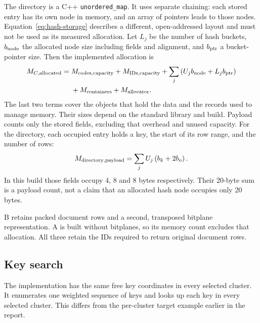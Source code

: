 The directory is a C++ \texttt{unordered\_map}. It uses separate chaining: each stored entry has its own node in memory, and an array of
pointers leads to those nodes. Equation~\eqref{eq:hash-storage}
describes a different, open-addressed layout and must not be used as its measured allocation.
Let $L_j$ be the number of hash buckets, $b_{\rm node}$ the allocated node size including fields
and alignment, and $b_{\rm ptr}$ a bucket-pointer size. Then the implemented allocation is
\begin{align}
M_{C,\rm allocated}={}&M_{\rm codes,capacity}+M_{\rm IDs,capacity}
 +\sum_j\left(U_j b_{\rm node}+L_j b_{\rm ptr}\right)\notag\\
 &+M_{\rm containers}+M_{\rm allocator}.
\label{eq:native-key-storage}
\end{align}
The last two terms cover the objects that hold the data and the records used to manage memory.
Their sizes depend on the standard library and build. Payload counts only the stored fields,
excluding that overhead and unused capacity. For the directory, each occupied entry holds a
key, the start of its row range, and the number of rows:
\[
M_{\rm directory,payload}=\sum_j U_j\left(b_k+2b_o\right).
\]
In this build those fields occupy 4, 8 and 8 bytes respectively. Their 20-byte sum is a payload
count, not a claim that an allocated hash node occupies only 20 bytes.

B retains packed document rows and a second, transposed bitplane representation. A is built
without bitplanes, so its memory count excludes that allocation.
All three retain the IDs required to return original document rows.

\subsection{Key search}
The implementation has the same free key coordinates in every selected cluster. It enumerates
one weighted sequence of keys and looks up each key in every selected cluster. This differs
from the per-cluster target example earlier in the report.


